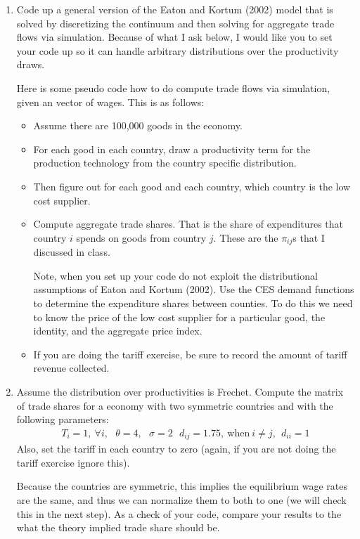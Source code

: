 \documentclass[pdftex,11pt]{article}
\begin{document}
\begin{enumerate}
\item Code up a general version of the Eaton and Kortum (2002) model that is solved by discretizing the continuum and then solving for aggregate trade flows via simulation. Because of what I ask below, I would like you to set your code up so it can handle arbitrary distributions over the productivity draws.

    Here is some pseudo code how to do compute trade flows via simulation, given an vector of wages. This is as follows:
    \begin{itemize}
    \item Assume there are 100,000 goods in the economy.
    \item For each good in each country, draw a productivity term for the production technology from the country specific distribution.
    \item Then figure out for each good and each country, which country is the low cost supplier.
    \item Compute aggregate trade shares. That is the share of expenditures that country $i$ spends on goods from country $j$. These are the $\pi_{ij}$s that I discussed in class.

        Note, when you set up your code do not exploit the distributional assumptions of Eaton and Kortum (2002). Use the CES demand functions to determine the expenditure shares between counties. To do this we need to know the price of the low cost supplier for a particular good, the identity, and the aggregate price index.

    \item If you are doing the tariff exercise, be sure to record the amount of tariff revenue collected.
    \end{itemize}
\item Assume the distribution over productivities is Frechet. Compute the matrix of trade shares for a economy with two symmetric countries and with the following parameters:
    \begin{eqnarray*}
    T_i = 1, \ \forall i, \ \ \ \theta = 4, \ \ \  \sigma = 2 \ \ \ d_{ij} = 1.75, \ \mbox{when} \ i \neq j, \ \ d_{ii} = 1
    \end{eqnarray*}
    Also, set the tariff in each country to zero (again, if you are not doing the tariff exercise ignore this).

    Because the countries are symmetric, this implies the equilibrium wage rates are the same, and thus we can normalize them to both to one (we will check this in the next step). As a check of your code, compare your results to the what the theory implied trade share should be.


\end{enumerate}
\end{document}
